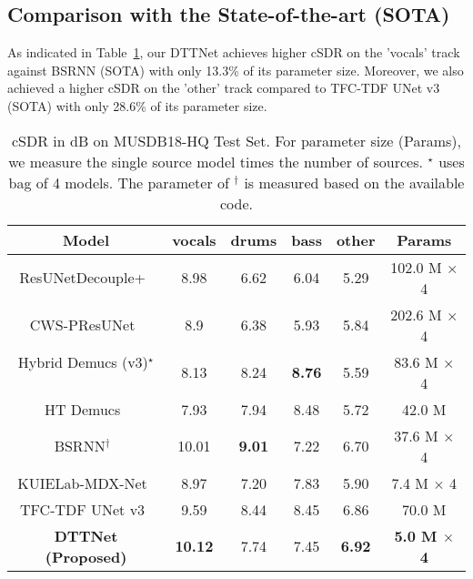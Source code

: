 \subsection{Comparison with the State-of-the-art (SOTA)}
As indicated in Table~\ref{results}, our DTTNet achieves higher cSDR on the 'vocals' track against BSRNN (SOTA) with only 13.3\% of its parameter size. Moreover, we also achieved a higher cSDR on the 'other' track compared to TFC-TDF UNet v3 (SOTA) with only 28.6\% of its parameter size.
\begin{table}[h]
    \centering
    \caption{cSDR in dB on MUSDB18-HQ Test Set. For parameter size (Params), we measure the single source model times the number of sources. $^\star$ uses bag of 4 models. The parameter of $^\dagger$ is measured based on the available code.\protect\footnotemark}\label{results}
    \begin{adjustbox}{width=0.48\textwidth}
    \begin{tabular}{c cccc c}\hline
        Model &vocals &drums & bass & other  & Params
        \\\hline

ResUNetDecouple+~\cite{kong_decoupling_2021}& 
        8.98 & 6.62 & 6.04 & 5.29  & 102.0 M $\times$ 4\\
        
        CWS-PResUNet~\cite{liu_cws-presunet_2021} & 
        8.9 &  6.38  & 5.93 & 5.84  & 202.6 M $\times$ 4\\
        
        Hybrid Demucs (v3)$^\star$~\cite{defossez_hybrid_2021} & 
        8.13 &  8.24 &  \textbf{8.76} &5.59  & 83.6 M $\times$ 4\\
        
        HT Demucs~\cite{rouard_hybrid_2022} & 
        7.93 &  7.94 &  8.48 & 5.72  &  42.0 M\\
        
        BSRNN$^\dagger$~\cite{luo_music_2022} & 
        10.01 &  \textbf{9.01} &  7.22& 6.70& 37.6 M $\times$ 4\\
        
        KUIELab-MDX-Net~\cite{kimKUIELabMDXNetTwoStreamNeural2021} &8.97  &7.20  &7.83 &5.90  & 7.4 M $\times$ 4\\
        
        TFC-TDF UNet v3~\cite{kim_sound_2023} & 
        9.59 &  8.44 &  8.45 & 6.86 & 70.0 M\\\hline
        
        
        \textbf{DTTNet (Proposed)} & \textbf{10.12} & 7.74 & 7.45 & \textbf{6.92} & \textbf{5.0 M $\times$ 4} \\ 
\hline 
    \end{tabular}
    
    \end{adjustbox}
	
\end{table}
